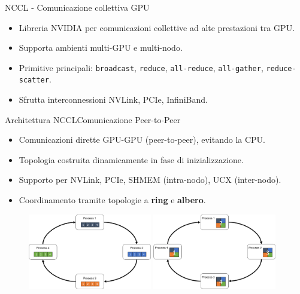 \documentclass{beamer}
\begin{document}
\begin{frame}{NCCL - Comunicazione collettiva GPU}
    \begin{itemize}
        \item Libreria NVIDIA per comunicazioni collettive ad alte prestazioni tra GPU.
        \item Supporta ambienti multi-GPU e multi-nodo.
        \item Primitive principali: \texttt{broadcast}, \texttt{reduce}, \texttt{all-reduce}, \texttt{all-gather}, \texttt{reduce-scatter}.
        \item Sfrutta interconnessioni NVLink, PCIe, InfiniBand.
    \end{itemize}
\end{frame}

\begin{frame}{Architettura NCCL}{Comunicazione Peer-to-Peer}
    \begin{itemize}
        \item Comunicazioni dirette GPU-GPU (peer-to-peer), evitando la CPU.
        \item Topologia costruita dinamicamente in fase di inizializzazione.
        \item Supporto per NVLink, PCIe, SHMEM (intra-nodo), UCX (inter-nodo).
        \item Coordinamento tramite topologie a \textbf{ring} e \textbf{albero}.
    \end{itemize}

    \begin{figure}
        \centering
        \includegraphics[width=0.48\textwidth]{imgs/nccl_topology_ring_tree.png}%
        \hfill
        \includegraphics[width=0.48\textwidth]{imgs/nccl_topology_ring_tree_2.png}
        \label{fig:ring-tree}
    \end{figure}
\end{frame}
\end{document}
